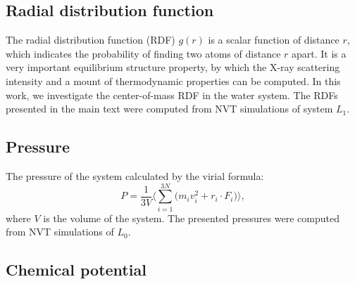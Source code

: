 \documentclass[a4paper,preprint,unsortedaddress,onecolumn,fleqn]{revtex4}
\begin{document}
\subsection{Radial distribution function}

The radial distribution function (RDF) $g(r)$ is a scalar function of
distance $r$, which indicates the probability of finding two atoms of
distance $r$ apart. It is a very important equilibrium structure property,
by which the X-ray scattering intensity and a mount of thermodynamic
properties can be computed. In this work, we investigate the center-of-mass
RDF in the water system. The RDFs presented in the main text were computed
from NVT simulations of system $L_1$.


\subsection{Pressure}

The pressure of the system calculated by the virial formula: 
\begin{equation*}
P=\frac{1}{3V}\Bigg\langle\sum_{i=1}^{3N}\Big(m_{i}\mathbf{\mathit{v}}%
_{i}^{2}+\mathbf{\mathit{r}}_{i}\cdot \mathbf{\mathit{F}}_{i}\Big)%
\Bigg\rangle,
\end{equation*}%
where $V$ is the volume of the system. The presented pressures were computed
from NVT simulations of $L_{0}$.

\subsection{Chemical potential}
\end{document}
